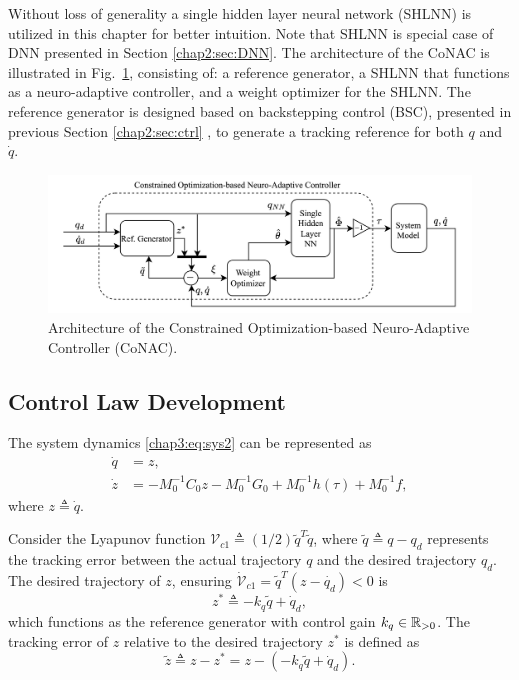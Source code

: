 Without loss of generality a single hidden layer neural network (SHLNN) is utilized in this chapter for better intuition. 
Note that SHLNN is special case of DNN presented in Section \ref{chap2:sec:DNN}.
The architecture of the CoNAC is illustrated in Fig.~\ref{chap3:fig:ctrl}, consisting of: a reference generator, a SHLNN that functions as a neuro-adaptive controller, and a weight optimizer for the SHLNN. 
The reference generator is designed based on backstepping control (BSC), presented in previous Section \ref{chap2:sec:ctrl} , to generate a tracking reference for both $q$ and $\dot q$.

\begin{figure}[t]
    \centering
    \includegraphics[width=0.9\linewidth]{imgs/ControllerChap3.drawio.png}
    \caption{Architecture of the Constrained Optimization-based Neuro-Adaptive Controller (CoNAC).}
    \label{chap3:fig:ctrl}
\end{figure}

\subsection{Control Law Development} \label{chap3:sec:ctrl_dev}

The system dynamics \eqref{chap3:eq:sys2} can be represented as
\begin{equation}
    \begin{aligned}
        \dot {q} &= {z},\\
        \dot {z} &= -M_0^{-1} C_0 {z}-M_0^{-1} G_0+M_0^{-1} h(\tau) + M_0^{-1} f,
    \end{aligned}
    \label{chap3:eq:x_dyna}
\end{equation}
where ${z}\triangleq \dot q$.

Consider the Lyapunov function ${\mathcal V}_{c1}\triangleq(1/2){\tilde q}^T  {\tilde q}$, where ${\tilde q}\triangleq {q}-{q_d}$ represents the tracking error between the actual trajectory ${q}$ and the desired trajectory $q_d$. 
The desired trajectory of ${z}$, ensuring $\dot {\mathcal V}_{c1}={\tilde q}^T  ({z}-\dot {q_d})<0$ is 
\begin{equation}
    {z^*} \triangleq -{k_q}{\tilde q} + \dot q_d,
\end{equation}
which functions as the reference generator with control gain ${k_q} \in\mathbb{R}_{>0}$. The tracking error of ${z}$ relative to the desired trajectory ${z^*}$ is defined as
\begin{equation}
    {\tilde z} \triangleq {z} - {z^*} = {z} - (-{k_q}{\tilde q} + \dot q_d).
    \label{chap3:eq:e2}
\end{equation}

